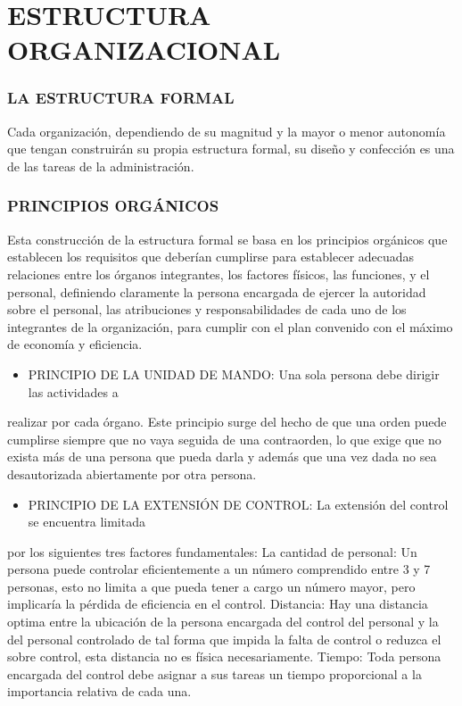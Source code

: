\section*{ESTRUCTURA ORGANIZACIONAL}
\subsubsection*{LA ESTRUCTURA FORMAL}
Cada organización, dependiendo de su magnitud y la mayor o menor autonomía que tengan construirán su propia estructura formal, su diseño y confección es una de las tareas de la administración.

\subsubsection*{PRINCIPIOS ORGÁNICOS}
Esta construcción de la estructura formal se basa en los principios orgánicos que establecen los requisitos que deberían cumplirse para establecer adecuadas relaciones entre los órganos integrantes, los factores físicos, las funciones, y el personal, definiendo claramente la persona encargada de ejercer la autoridad sobre el personal, las atribuciones y responsabilidades de cada uno de los integrantes de la organización, para cumplir con el plan convenido con el máximo de economía y eficiencia.

\begin{itemize}
  \item PRINCIPIO DE LA UNIDAD DE MANDO: Una sola persona debe dirigir las actividades a
\end{itemize}
realizar por cada órgano. Este principio surge del hecho de que una orden puede cumplirse siempre que no vaya seguida de una contraorden, lo que exige que no exista más de una persona que pueda darla y además que una vez dada no sea desautorizada abiertamente por otra persona.

\begin{itemize}
  \item PRINCIPIO DE LA EXTENSIÓN DE CONTROL: La extensión del control se encuentra limitada
\end{itemize}
por los siguientes tres factores fundamentales: La cantidad de personal: Un persona puede controlar eficientemente a un número comprendido entre 3 y 7 personas, esto no limita a que pueda tener a cargo un número mayor, pero implicaría la pérdida de eficiencia en el control. Distancia: Hay una distancia optima entre la ubicación de la persona encargada del control del personal y la del personal controlado de tal forma que impida la falta de control o reduzca el sobre control, esta distancia no es física necesariamente. Tiempo: Toda persona encargada del control debe asignar a sus tareas un tiempo proporcional a la importancia relativa de cada una.

